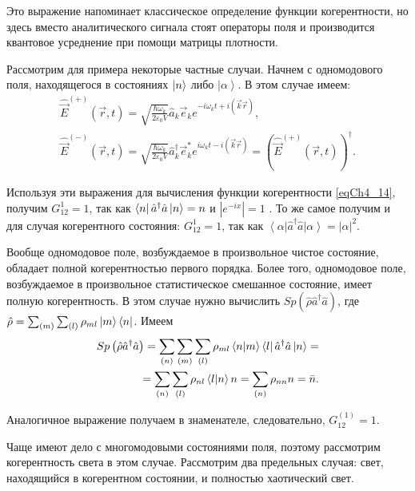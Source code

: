 Это выражение напоминает классическое определение функции
когерентности, но здесь вместо аналитического сигнала стоят операторы
поля и производится квантовое усреднение при помощи матрицы
плотности. 

Рассмотрим для примера некоторые частные случаи. Начнем с одномодового
поля, находящегося в состояниях  $\ket{n}$  либо  $\left|\alpha\right>$.  В этом случае имеем: 
\begin{eqnarray}
\hat{\vec{E}}^{(+)}\left(\vec{r}, t\right) = \sqrt{\frac{\hbar \omega_k}{2 \varepsilon_0
    V}} \hat{a}_k \vec{e}_k e^{-i \omega_k t + i \left(\vec{k}\vec{r}
  \right)},
\nonumber \\
\hat{\vec{E}}^{(-)}\left(\vec{r}, t\right) = \sqrt{\frac{\hbar \omega_k}{2 \varepsilon_0
V}} \hat{a}_k^{\dag} \vec{e}_k^{*} e^{i \omega_k t - i \left(\vec{k}\vec{r}
  \right)} = \left(\hat{\vec{E}}^{(+)}\left(\vec{r}, t\right)\right)^{\dag}.
\label{eqCh4_15}
\end{eqnarray}

Используя эти выражения для вычисления функции когерентности
\eqref{eqCh4_14}, получим $G_{12}^{1} = 1$,  так как
$\bra{n}\hat{a}^{\dag}\hat{a}\ket{n} = n$   и
$\left|e^{-i x}\right| = 1$ . То же самое получим и для случая
когерентного состояния:  $G_{12}^{1} = 1$,  так как
$\left<\alpha\right|\hat{a}^{\dag}\hat{a}\left|\alpha\right> =
\left|\alpha\right|^2$. 

Вообще одномодовое поле, возбуждаемое в произвольное 
чистое состояние, 
обладает полной когерентностью первого порядка. Более того,
одномодовое поле, возбуждаемое в произвольное статистическое смешанное
состояние, имеет полную когерентность. В этом случае нужно вычислить
$Sp \left(\hat{\rho} \hat{a}^{\dag}\hat{a}\right)$,  где  $\hat{\rho} =
\sum_{(m)}\sum_{(l)}\rho_{ml}\ket{m}\bra{n}$.  Имеем  
\begin{eqnarray}
Sp \left(\hat{\rho} \hat{a}^{\dag}\hat{a}\right) = 
\sum_{(n)}\sum_{(m)}\sum_{(l)}\rho_{ml}\bra{n}\ket{m}\bra{l}
\hat{a}^{\dag}\hat{a}\ket{n} = 
\nonumber \\
= \sum_{(n)}\sum_{(l)}\rho_{nl}\bra{l}\ket{n}n = 
\sum_{(n)}\rho_{nn}n = \bar{n}.
\label{eqCh4_16}
\end{eqnarray}

Аналогичное выражение получаем в знаменателе, следовательно,
$G_{12}^{(1)} = 1$.

Чаще имеют дело с многомодовыми состояниями поля, поэтому рассмотрим
когерентность света в этом случае. Рассмотрим два предельных случая:
свет, находящийся в когерентном состоянии, и полностью хаотический
свет. 

